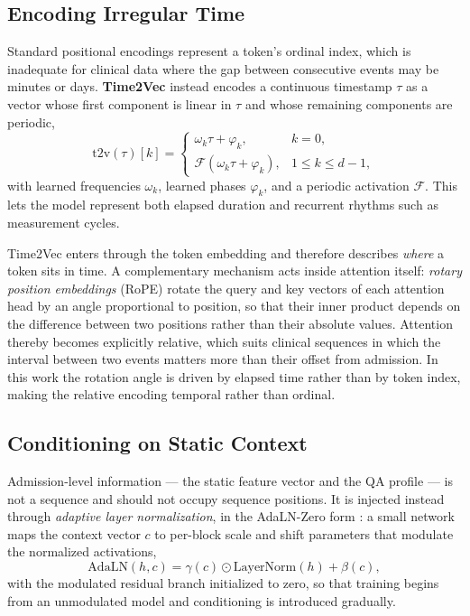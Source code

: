 \subsection{Encoding Irregular Time}

Standard positional encodings represent a token's ordinal index, which is inadequate for clinical data where the gap between consecutive events may be minutes or days. \textbf{Time2Vec} \citep{kazemi2019time2vec} instead encodes a continuous timestamp $\tau$ as a vector whose first component is linear in $\tau$ and whose remaining components are periodic,
\[
\mathrm{t2v}(\tau)[k] =
\begin{cases}
\omega_k \tau + \varphi_k, & k = 0,\\[2pt]
\mathcal{F}(\omega_k \tau + \varphi_k), & 1 \le k \le d-1,
\end{cases}
\]
with learned frequencies $\omega_k$, learned phases $\varphi_k$, and a periodic activation $\mathcal{F}$. This lets the model represent both elapsed duration and recurrent rhythms such as measurement cycles.

Time2Vec enters through the token embedding and therefore describes \emph{where} a token sits in time. A complementary mechanism acts inside attention itself: \emph{rotary position embeddings} (RoPE) \citep{su2024roformer} rotate the query and key vectors of each attention head by an angle proportional to position, so that their inner product depends on the difference between two positions rather than their absolute values. Attention thereby becomes explicitly relative, which suits clinical sequences in which the interval between two events matters more than their offset from admission. In this work the rotation angle is driven by elapsed time rather than by token index, making the relative encoding temporal rather than ordinal.

\subsection{Conditioning on Static Context}

Admission-level information --- the static feature vector and the QA profile --- is not a sequence and should not occupy sequence positions. It is injected instead through \emph{adaptive layer normalization}, in the AdaLN-Zero form \citep{peebles2023adaln0}: a small network maps the context vector $c$ to per-block scale and shift parameters that modulate the normalized activations,
\[
\mathrm{AdaLN}(h, c) = \gamma(c) \odot \mathrm{LayerNorm}(h) + \beta(c),
\]
with the modulated residual branch initialized to zero, so that training begins from an unmodulated model and conditioning is introduced gradually.

